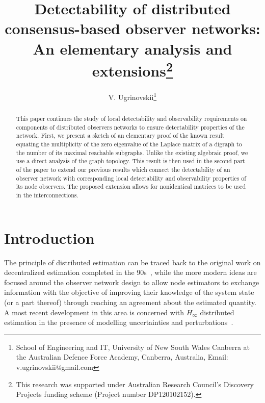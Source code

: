 \documentclass[a4paper,10pt,conference]{ieeeconf}
\begin{document}
\title{Detectability of distributed
  consensus-based observer networks:\\ An elementary analysis and
  extensions\thanks{This research was supported under Australian Research 
    Council's Discovery
Projects funding scheme (Project number DP120102152).}}

\author{V. Ugrinovskii\thanks{School of Engineering and IT, University of
    New South Wales Canberra
  at the Australian Defence Force Academy, Canberra, Australia, Email:
  v.ugrinovskii@gmail.com}} 

\maketitle
          


\begin{abstract}
This paper continues the study of local detectability and
observability requirements on components of distributed observers networks 
to ensure detectability properties of the network. First, we present a
sketch of an
elementary proof of the known result equating the
multiplicity of the zero eigenvalue of the Laplace matrix of a digraph
to the number of its maximal reachable subgraphs.
Unlike the existing algebraic proof, we use a direct analysis
of the graph topology. This result is then used in the second part of the
paper to extend our previous results which connect the detectability of an
observer network with corresponding local detectability and observability
properties of its node observers. The proposed extension allows for nonidentical
matrices to be used in the interconnections.  
\end{abstract}


\section{Introduction}
The principle of distributed estimation can be traced back to the original work
on decentralized estimation completed in the
90s~\cite{BD-1992,CS-1995}, while the more modern ideas are focused around
the observer network design to allow node
estimators to exchange information with the objective of improving their
knowledge of the system 
state (or a part thereof) through reaching an agreement about the estimated
quantity. 
A most recent development in this area is
concerned with  $H_\infty$ distributed estimation in the presence of modelling
uncertainties and perturbations~\cite{SWH-2010,U6,LaU1,U7,UFri1}.      
\end{document}
